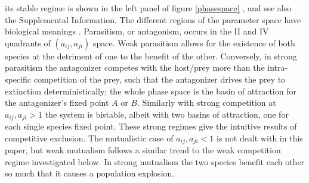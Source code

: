 \documentclass[a4paper,10pt]{article}
\numberwithin{equation}{section} %
\begin{document}
%
its stable regime is shown in the left panel of figure \ref{phasespace} \cite{Neuhauser1999,Cox2010}, and see also the Supplemental Information. 
The different regions of the parameter space have biological meanings \cite{Chotibut2015}. %
Parasitism, or antagonism, occurs in the II and IV quadrants of $(a_{ij},a_{ji})$ space. 
Weak parasitism allows for the existence of both species at the detriment of one to the benefit of the other. 
Conversely, in strong parasitism the antagonizer competes with the host/prey more than the intra-specific competition of the prey, such that the antagonizer drives the prey to extinction deterministically; the whole phase space is the basin of attraction for the antagonizer's fixed point $A$ or $B$. %
Similarly with strong competition at $a_{ij},a_{ji}>1$ the system is bistable, albeit with two basins of attraction, one for each single species fixed point. %
These strong regimes give the intuitive results of competitive exclusion. 
The mutualistic case of $a_{ij},a_{ji}<1$ is not dealt with in this paper, but weak mutualism follows a similar trend to the weak competition regime investigated below. %
In strong mutualism the two species benefit each other so much that it causes a population explosion. 
\end{document}
